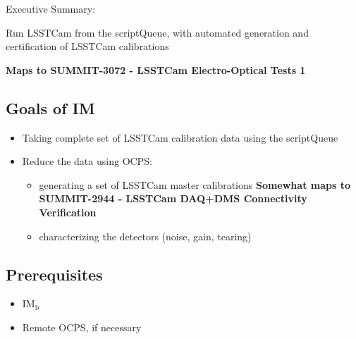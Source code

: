 
Executive Summary:

Run LSSTCam from the scriptQueue, with automated generation and certification of LSSTCam calibrations

\textbf{Maps to SUMMIT-3072 - LSSTCam Electro-Optical Tests 1}

\subsection{Goals of IM}
\begin{itemize}
\item Taking complete set of LSSTCam calibration data using the scriptQueue
\item Reduce the data using \gls{OCPS}:
  \begin{itemize}
  \item generating a set of LSSTCam master calibrations \textbf{Somewhat maps to SUMMIT-2944 - LSSTCam DAQ+DMS Connectivity Verification}
  \item characterizing the detectors (noise, gain, tearing)
  \end{itemize}
\end{itemize}
\subsection{Prerequisites}

\begin{itemize}
\item{IM\(_{\text{b}}\)}
\item{Remote \gls{OCPS}, if necessary}
\end{itemize}

